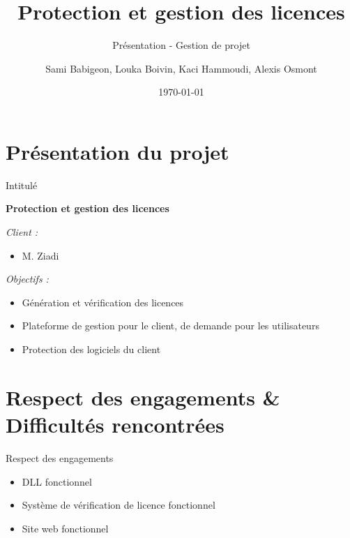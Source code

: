 \documentclass{cubeamer}
\title{Protection et gestion des licences}
\subtitle{Présentation - Gestion de projet}
\author{Sami Babigeon, Louka Boivin, Kaci Hammoudi, Alexis Osmont}
\date{\today}
\institute[Université de Rouen]{Master Informatique - 1ère année}
\begin{document}
\maketitle

\cutoc
%
%

\section{Présentation du projet}

\begin{frame}{Intitulé}
    \centerline{\textbf{Protection et gestion des licences}}
    \medskip
    \emph{Client :}
    \begin{itemize}
        \item M. Ziadi
    \end{itemize}
    \emph{Objectifs :}
    \begin{itemize}
        \item Génération et vérification des licences
        \item Plateforme de gestion pour le client, de demande pour les utilisateurs
        \item Protection des logiciels du client
    \end{itemize}
\end{frame}

\section{Respect des engagements \& Difficultés rencontrées}

\begin{frame}{Respect des engagements}
    \begin{itemize}
        \item DLL fonctionnel
        \item Système de vérification de licence fonctionnel
        \item Site web fonctionnel
    \end{itemize}
\end{frame}
\end{document}
